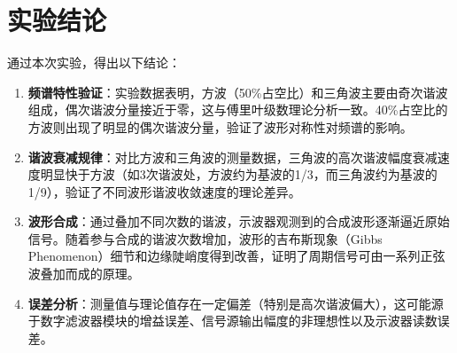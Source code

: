 \documentclass[12pt]{ctexart}
\begin{document}
\newpage

\section{实验结论}
通过本次实验，得出以下结论：
\begin{enumerate}
    \item \textbf{频谱特性验证}：实验数据表明，方波（50\%占空比）和三角波主要由奇次谐波组成，偶次谐波分量接近于零，这与傅里叶级数理论分析一致。40\%占空比的方波则出现了明显的偶次谐波分量，验证了波形对称性对频谱的影响。
    \item \textbf{谐波衰减规律}：对比方波和三角波的测量数据，三角波的高次谐波幅度衰减速度明显快于方波（如3次谐波处，方波约为基波的1/3，而三角波约为基波的1/9），验证了不同波形谐波收敛速度的理论差异。
    \item \textbf{波形合成}：通过叠加不同次数的谐波，示波器观测到的合成波形逐渐逼近原始信号。随着参与合成的谐波次数增加，波形的吉布斯现象（Gibbs Phenomenon）细节和边缘陡峭度得到改善，证明了周期信号可由一系列正弦波叠加而成的原理。
    \item \textbf{误差分析}：测量值与理论值存在一定偏差（特别是高次谐波偏大），这可能源于数字滤波器模块的增益误差、信号源输出幅度的非理想性以及示波器读数误差。
\end{enumerate}
\end{document}
